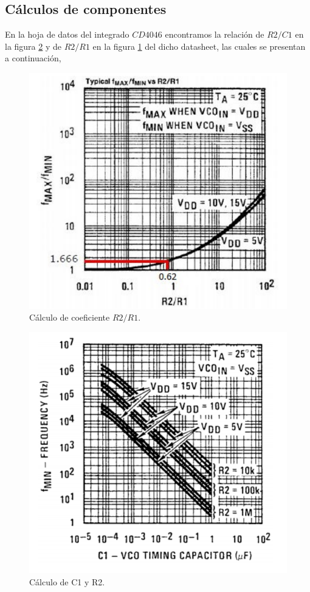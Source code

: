 \documentclass[twocolumn]{article}
\begin{document}
\subsection{Cálculos de componentes}
En la hoja de datos del integrado $CD4046$ encontramos la relación de $R2/C1$ en la figura \textcolor{blue}{{\ref{fig:fig4}}} y de $R2/R1$ en la figura \textcolor{blue}{{\ref{fig:fig3}}} del dicho datasheet, las cuales se presentan a continuación, 

\begin{figure}[!ht]
  \centering    
  \includegraphics[width=\columnwidth]{imagenes/fig3.jpg}
	\caption{Cálculo de coeficiente $R2/R1$.}\label{fig:fig3}
\end{figure}

\begin{figure}[!ht]
  \centering    
  \includegraphics[width=\columnwidth]{imagenes/fig4.jpg}
	\caption{Cálculo de C1 y R2.}\label{fig:fig4}
\end{figure}
\end{document}
